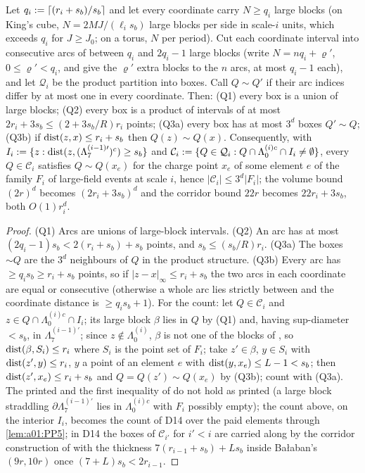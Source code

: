\begin{lemma}\label{lem:a01:PP}
Let $q_i:=\lceil(r_i+s_b)/s_b\rceil$ and let every coordinate carry $N\ge q_i$ large blocks (on King's cube, $N=2MJ/(\ell_is_b)$ large blocks per side in scale-$i$ units, which exceeds $q_i$ for $J\ge J_0$; on a torus, $N$ per period). Cut each coordinate interval into consecutive arcs of between $q_i$ and $2q_i-1$ large blocks (write $N=nq_i+\varrho'$, $0\le\varrho'<q_i$, and give the $\varrho'$ extra blocks to the $n$ arcs, at most $q_i-1$ each), and let $\mathcal Q_i$ be the product partition into boxes. Call $Q\sim Q'$ if their arc indices differ by at most one in every coordinate. Then: \textup{(Q1)} every box is a union of large blocks; \textup{(Q2)} every box is a product of intervals of at most $2r_i+3s_b\le(2+3s_b/R)r_i$ points; \textup{(Q3a)} every box has at most $3^d$ boxes $Q'\sim Q$; \textup{(Q3b)} if $\operatorname{dist}(z,x)\le r_i+s_b$ then $Q(z)\sim Q(x)$. Consequently, with $I_i:=\{z:\operatorname{dist}(z,(\Lambda_7^{(i-1)\prime})^c)\ge s_b\}$ and $\mathcal C_i:=\{Q\in\mathcal Q_i:Q\cap\Lambda_0^{(i)c}\cap I_i\ne\emptyset\}$, every $Q\in\mathcal C_i$ satisfies $Q\sim Q(x_e)$ for the charge point $x_e$ of some element $e$ of the family $F_i$ of large-field events at scale $i$, hence $|\mathcal C_i|\le3^d|F_i|$; the volume bound $(2r)^d$ becomes $(2r_i+3s_b)^d$ and the corridor bound $22r$ becomes $22r_i+3s_b$, both $O(1)r_i^d$.
\end{lemma}
\begin{proof}
(Q1) Arcs are unions of large-block intervals. (Q2) An arc has at most $(2q_i-1)s_b<2(r_i+s_b)+s_b$ points, and $s_b\le(s_b/R)r_i$. (Q3a) The boxes $\sim Q$ are the $3^d$ neighbours of $Q$ in the product structure. (Q3b) Every arc has $\ge q_is_b\ge r_i+s_b$ points, so if $|z-x|_\infty\le r_i+s_b$ the two arcs in each coordinate are equal or consecutive (otherwise a whole arc lies strictly between and the coordinate distance is $\ge q_is_b+1$). For the count: let $Q\in\mathcal C_i$ and $z\in Q\cap\Lambda_0^{(i)c}\cap I_i$; its large block $\beta$ lies in $Q$ by (Q1) and, having sup-diameter $<s_b$, in $\Lambda_7^{(i-1)\prime}$; since $z\notin\Lambda_0^{(i)}$, $\beta$ is not one of the blocks of \cite[p.~570]{Ba2}, so $\operatorname{dist}(\beta,S_i)\le r_i$ where $S_i$ is the point set of $F_i$; take $z'\in\beta$, $y\in S_i$ with $\operatorname{dist}(z',y)\le r_i$, $y$ a point of an element $e$ with $\operatorname{dist}(y,x_e)\le L-1<s_b$; then $\operatorname{dist}(z',x_e)\le r_i+s_b$ and $Q=Q(z')\sim Q(x_e)$ by (Q3b); count with (Q3a). The printed \cite[(3.45)]{Ba2} and the first inequality of \cite[(3.46)]{Ba2} do not hold as printed (a large block straddling $\partial\Lambda_7^{(i-1)\prime}$ lies in $\Lambda_0^{(i)c}$ with $F_i$ possibly empty); the count above, on the interior $I_i$, becomes the count of D14 over the paid elements through \cref{lem:a01:PP5}; in D14 the boxes of $\mathcal C_{i'}$ for $i'<i$ are carried along by the corridor construction of \cite[(3.48)--(3.50)]{Ba2} with the thickness $7(r_{i-1}+s_b)+Ls_b$ inside Ba{\l}aban's $(9r,10r)$ once $(7+L)s_b<2r_{i-1}$.
\end{proof}


